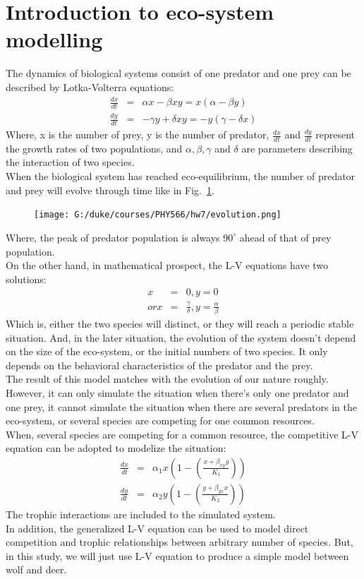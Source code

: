 \documentclass[a4paper,12pt]{article}
\begin{document}
\section{Introduction to eco-system modelling}
The dynamics of biological systems consist of one predator and one prey can be described by Lotka-Volterra equations:
\begin{eqnarray*}
\frac{dx}{dt} &=& \alpha x - \beta x y = x(\alpha - \beta y) \\
\frac{dy}{dt} &=& - \gamma y + \delta x y = - y (\gamma - \delta x)
\end{eqnarray*}
Where, x is the number of prey, y is the number of predator, $\frac{dx}{dt}$ and $\frac{dy}{dt}$ represent the growth rates of two populations, and $\alpha, \beta, \gamma$ and $\delta$ are parameters describing the interaction of two species. \\
When the biological system has reached eco-equilibrium, the number of predator and prey will evolve through time like in Fig.~\ref{Fig:evolution}.
\begin{figure}[!htb]
  \centering
  \texttt{[image: G:/duke/courses/PHY566/hw7/evolution.png]}
  \caption{}\label{Fig:evolution}
\end{figure}
Where, the peak of predator population is always $90^{\circ}$ ahead of that of prey population. \\
On the other hand, in mathematical prospect, the L-V equations have two solutions:
\begin{eqnarray*}
x &=& 0, y = 0 \\
or x &=& \frac{\gamma}{\delta}, y = \frac{\alpha}{\beta}
\end{eqnarray*}
Which is, either the two species will distinct, or they will reach a periodic stable situation. And, in the later situation, the evolution of the system doesn't depend on the size of the eco-system, or the initial numbers of two species. It only depends on the behavioral characteristics of the predator and the prey. \\
The result of this model matches with the evolution of our nature roughly. However, it can only simulate the situation when there's only one predator and one prey, it cannot simulate the situation when there are several predators in the eco-system, or several species are competing for one common resources. \\
When, several species are competing for a common resource, the competitive L-V equation can be adopted to modelize the situation:
\begin{eqnarray*}
\frac{dx}{dt} &=& \alpha_1 x (1- (\frac{x + \beta_{xy} y}{K_1})) \\
\frac{dy}{dt} &=& \alpha_2 y (1 - (\frac{y + \beta_{yx} x}{K_2}))
\end{eqnarray*}
The trophic interactions are included to the simulated system. \\
In addition, the generalized L-V equation can be used to model direct competition and trophic relationships between arbitrary number of species. But, in this study, we will just use L-V equation to produce a simple model between wolf and deer. \\
\end{document}
